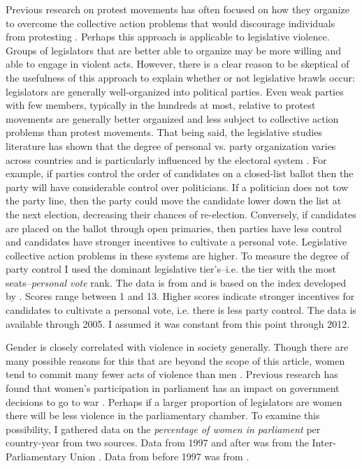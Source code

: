 \documentclass[a4paper]{article}\usepackage[]{graphicx}\usepackage[]{color}
\begin{document}
Previous research on protest movements has often focused on how they organize to overcome the collective action problems that would discourage individuals from protesting \citep{lohmann1994,tucker2007}. Perhaps this approach is applicable to legislative violence. Groups of legislators that are better able to organize may be more willing and able to engage in violent acts. However, there is a clear reason to be skeptical of the usefulness of this approach to explain whether or not legislative brawls occur: legislators are generally well-organized into political parties. Even weak parties with few members, typically in the hundreds at most, relative to protest movements are generally better organized and less subject to collective action problems than protest movements. That being said, the legislative studies literature has shown that the degree of personal vs. party organization varies across countries and is particularly influenced by the electoral system \citep{carey1995}. For example, if parties control the order of candidates on a closed-list ballot then the party will have considerable control over politicians. If a politician does not tow the party line, then the party could move the candidate lower down the list at the next election, decreasing their chances of re-election. Conversely, if candidates are placed on the ballot through open primaries, then parties have less control and candidates have stronger incentives to cultivate a personal vote. Legislative collective action problems in these systems are higher. To measure the degree of party control I used the dominant legislative tier's--i.e. the tier with the most seats--\emph{personal vote} rank. The data is from \cite{johnson2012} and is based on the index developed by \cite{carey1995}. Scores range between 1 and 13. Higher scores indicate stronger incentives for candidates to cultivate a personal vote, i.e. there is less party control. The data is available through 2005. I assumed it was constant from this point through 2012.

Gender is closely correlated with violence in society generally. Though there are many possible reasons for this that are beyond the scope of this article, women tend to commit many fewer acts of violence than men \citep[]{Schwartz2009}. Previous research has found that women's participation in parliament has an impact on government decisions to go to war \citep{Melander2005}. Perhaps if a larger proportion of legislators are women there will be less violence in the parliamentary chamber. To examine this possibility, I gathered data on the \emph{percentage of women in parliament} per country-year from two sources. Data from 1997 and after was from the Inter-Parliamentary Union \citeyearpar{IPU2013}. Data from before 1997 was from \cite{Schwartz2009}.
\end{document}
